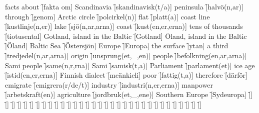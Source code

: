 \begin{questions}
    \begin{multicols}{2}
        \raggedcolumns
        \question facts about \f[fakta om]
        \question Scandinavia \f[skandinavisk(t/a)]
        \question peninsula \f[halvö(n,ar)]
        \question through \f[genom]
        \question Arctic circle \f[polcirkel(n)]
        \question flat \f[platt(a)]
        \question coast line \f[kustlinje(n,er)]
        \question lake \f[sjö(n,ar,arna)]
        \question coast \f[kust(en,er,erna)]
        \question tens of thousands \f[tiotusental]
        \question Gotland, island in the Baltic \f[Gotland]
        \question Öland, island in the Baltic \f[Öland]
        \question Baltic Sea \f[Östersjön]
        \question Europe \f[Europa]
        \question the surface \f[ytan]
        \question a third \f[tredjedel(n,ar,arna)]
        \question origin \f[unsprung(et,\_,en)]
        \question people \f[befolkning(en,ar,arna)]
        \question Sami people \f[same(n,r,rna)]
        \question Sami \f[samisk(t,a)]
        \question Parliament \f[parlament(et)]
        \question ice age \f[istid(en,er,erna)]
        \question Finnish dialect \f[meänkieli]
        \question poor \f[fattig(t,a)]
        \question therefore \f[därför]
        \question emigrate \f[emigrera(r/de/t)]
        \question industry \f[industri(n,er,erna)]
        \question manpower \f[arbetskraft(en)]
        \question agriculture \f[jordbruk(et,\_,ene)]
        \question Southern Europe \f[Sydeuropa]
        \question  \f[]
        \question  \f[]
        \question  \f[]
        \question  \f[]
        \question  \f[]
        \question  \f[]
        \question  \f[]
        \question  \f[]
        \question  \f[]
        \question  \f[]
        \question  \f[]
        \question  \f[]
        \question  \f[]
        \question  \f[]
        \question  \f[]
        \question  \f[]
        \question  \f[]
        \question  \f[]
        \question  \f[]
        \question  \f[]
        \question  \f[]
        \question  \f[]
        \question  \f[]
        \question  \f[]
        \question  \f[]
        \question  \f[]
        \question  \f[]
        \question  \f[]
        \question  \f[]
        \question  \f[]
        \question  \f[]
        \question  \f[]
        \question  \f[]
    \end{multicols}
\end{questions}
